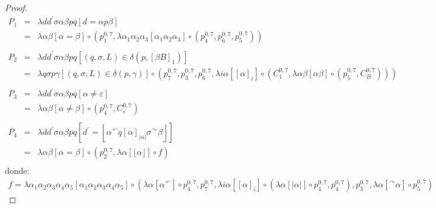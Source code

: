 \begin{proof}
    \begin{eqnarray*}
      P_1 &=& \lambda dd^{\prime}\sigma\alpha\beta pq \left[d = \alpha p \beta\right] \\
          &=& \lambda \alpha\beta\left[\alpha = \beta\right]
                \circ (
                  p_{1}^{0,7},
                  \lambda \alpha_1\alpha_2\alpha_3\left[\alpha_1\alpha_2\alpha_3\right]
                    \circ (
                      p_{4}^{0,7},
                      p_{6}^{0,7},
                      p_{5}^{0,7})) \\
      \\
      P_2 &=& \lambda dd^{\prime}\sigma\alpha\beta pq \left[(q,\sigma,L) \in \delta \left(p,\left[\beta B\right]_{1}
        \right)\right] \\
          &=& \lambda q\sigma p\gamma \left[(q,\sigma,L) \in \delta (p,\gamma)\right]
                \circ (
                  p_{7}^{0,7},
                  p_{3}^{0,7},
                  p_{6}^{0,7},
                  \lambda i\alpha \left[\left[\alpha\right]_i\right]
                  \circ (
                    C_{1}^{0,7},
                    \lambda \alpha \beta \left[ \alpha\beta \right] \circ (p_{5}^{0,7}, C_{B}^{0,7}))) \\
      \\
      P_3 &=& \lambda d d^{\prime}\sigma\alpha\beta p q \left[ \alpha \neq \varepsilon \right] \\
          &=& \lambda \alpha\beta \left[\alpha \neq \beta\right]
              \circ (
                p_{4}^{0,7},
                C_{\varepsilon}^{0,7}) \\
      \\
      P_4 &=& \lambda dd^{\prime}\sigma\alpha\beta pq \left[d^{\prime} = \left\lfloor \alpha^{\curvearrowleft}q
        \left[\alpha\right]_{\lvert \alpha \rvert } \sigma^{\curvearrowright} \beta \right\rfloor\right] \\
          &=& \lambda \alpha\beta\left[ \alpha=\beta \right]
                \circ (
                  p_{2}^{0,7},
                  \lambda \alpha \left[ \lfloor \alpha \rfloor \right] \circ f) \\
    \end{eqnarray*}
    \PN donde:
    \begin{align*}
      f =  \lambda\alpha_1\alpha_2\alpha_3\alpha_4\alpha_5 \left[ \alpha_1\alpha_2\alpha_3\alpha_4\alpha_5 \right]
            \circ (
              \lambda \alpha \left[ \alpha ^{\curvearrowleft } \right] \circ p_{4}^{0,7},
              p_{7}^{0,7},
              \lambda i\alpha \left[ \left[\alpha\right]_i \right]
                \circ (
                  \lambda \alpha \left[\lvert\alpha\rvert \right] \circ p_{4}^{0,7},
                  p_{4}^{0,7}
              ),
              p_{3}^{0,7},
              \lambda \alpha \left[ ^{\curvearrowright}\alpha \right] \circ p_{5}^{0,7}
            )
    \end{align*}


\end{proof}
